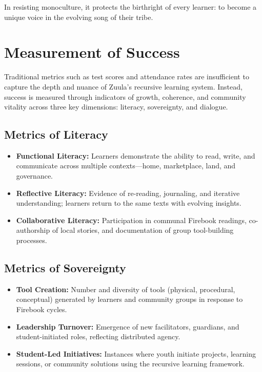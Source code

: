 \documentclass[12pt]{article}
\begin{document}
In resisting monoculture, it protects the birthright of every learner: to become a unique voice in the evolving song of their tribe.

\section*{Measurement of Success}

Traditional metrics such as test scores and attendance rates are insufficient to capture the depth and nuance of Zuula’s recursive learning system. Instead, success is measured through indicators of growth, coherence, and community vitality across three key dimensions: literacy, sovereignty, and dialogue.

\subsection*{Metrics of Literacy}

\begin{itemize}
    \item \textbf{Functional Literacy:} Learners demonstrate the ability to read, write, and communicate across multiple contexts—home, marketplace, land, and governance.
    \item \textbf{Reflective Literacy:} Evidence of re-reading, journaling, and iterative understanding; learners return to the same texts with evolving insights.
    \item \textbf{Collaborative Literacy:} Participation in communal Firebook readings, co-authorship of local stories, and documentation of group tool-building processes.
\end{itemize}

\subsection*{Metrics of Sovereignty}

\begin{itemize}
    \item \textbf{Tool Creation:} Number and diversity of tools (physical, procedural, conceptual) generated by learners and community groups in response to Firebook cycles.
    \item \textbf{Leadership Turnover:} Emergence of new facilitators, guardians, and student-initiated roles, reflecting distributed agency.
    \item \textbf{Student-Led Initiatives:} Instances where youth initiate projects, learning sessions, or community solutions using the recursive learning framework.
\end{itemize}
\end{document}
